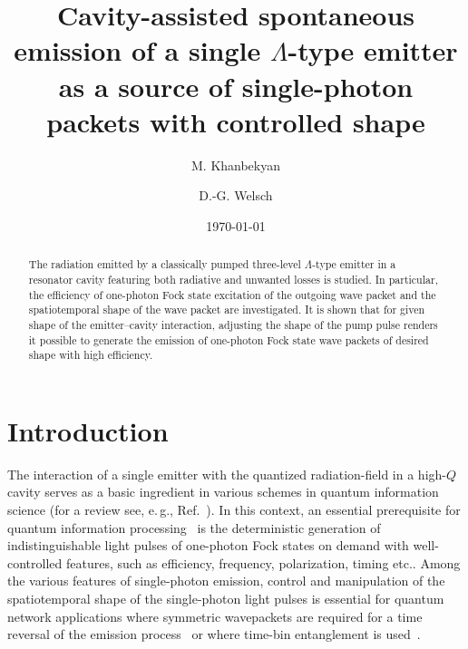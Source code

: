 \documentclass[pra, twocolumn]{revtex4}
\begin{document}
\title{Cavity-assisted spontaneous emission
of a single
$\Lambda$-type
emitter
as a source of single-photon packets with controlled shape
}

\author{M. Khanbekyan}

\author{D.-G. Welsch}

\date{\today}

\begin{abstract}
The radiation emitted by
a classically pumped
three-level $\Lambda$-type
emitter in a resonator cavity featuring
both radiative and unwanted losses
is studied.
In particular, the
efficiency of one-photon Fock state excitation of the
outgoing wave packet
and
the
spatiotemporal shape
of the wave packet
are investigated.
It is shown that for given
shape
of the emitter--cavity interaction,
adjusting the
shape
of the pump pulse 
renders it possible
to
generate the emission of one-photon Fock
state
wave packets of
desired shape with high efficiency.


\end{abstract}


\maketitle

\section{Introduction}
\label{introduction}
The interaction of a single emitter with
the
quantized radiation-field
in a high-$Q$ cavity
serves as a basic ingredient in various
schemes in quantum information
science (for a review see, e.\,g.,
Ref.~\cite{reiserer:1379}).
%
In this context, an essential prerequisite
for quantum information processing~\cite{knill:46} is the deterministic
generation of
indistinguishable
light pulses of one-photon Fock states
on demand with well-controlled features, such as efficiency,
frequency, polarization, timing etc..
Among the various features of single-photon emission, control
and manipulation of the spatiotemporal shape of the single-photon
light pulses is essential for quantum network applications where
symmetric wavepackets are required for a time reversal of the emission
process~\cite{cirac:3221} or where time-bin entanglement is
used~\cite{marcikic:062308}.
\end{document}
